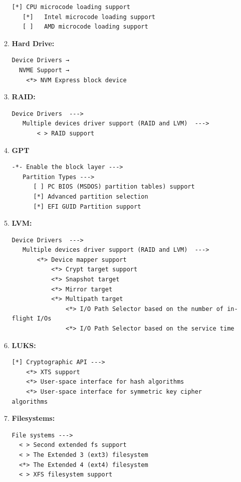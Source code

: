 \documentclass[10pt, a4paper, onecolumn, oneside, titlepage, openany]{book}
\begin{document}
\begin{enumerate}
\begin{enumerate}
\begin{Verbatim}[commandchars=\\\{\}]
   [*] CPU microcode loading support
   [*]   Intel microcode loading support
   [ ]   AMD microcode loading support
\end{Verbatim}
        \item \textbf{Hard Drive:}
\begin{Verbatim}[commandchars=\\\{\}]
Device Drivers →
  NVME Support →
    <*> NVM Express block device
\end{Verbatim}
        \item \textbf{RAID:}
\begin{Verbatim}[commandchars=\\\{\}]
Device Drivers  --->
   Multiple devices driver support (RAID and LVM)  --->
       < > RAID support
\end{Verbatim}
    \item \textbf{GPT}
\begin{Verbatim}[commandchars=\\\{\}]
-*- Enable the block layer --->
   Partition Types --->
      [ ] PC BIOS (MSDOS) partition tables) support
      [*] Advanced partition selection
      [*] EFI GUID Partition support
\end{Verbatim}
        \item \textbf{LVM:}
\begin{Verbatim}[commandchars=\\\{\}]
Device Drivers  --->
   Multiple devices driver support (RAID and LVM)  --->
       <*> Device mapper support
           <*> Crypt target support
           <*> Snapshot target
           <*> Mirror target
           <*> Multipath target
               <*> I/O Path Selector based on the number of in-flight I/Os
               <*> I/O Path Selector based on the service time
\end{Verbatim}
        \item \textbf{LUKS:}
\begin{Verbatim}[commandchars=\\\{\}]
[*] Cryptographic API --->
    <*> XTS support
    <*> User-space interface for hash algorithms
    <*> User-space interface for symmetric key cipher algorithms
\end{Verbatim}
        \item \textbf{Filesystems:}
\begin{Verbatim}[commandchars=\\\{\}]
File systems --->
  < > Second extended fs support
  < > The Extended 3 (ext3) filesystem
  <*> The Extended 4 (ext4) filesystem
  < > XFS filesystem support

\end{Verbatim}
\end{enumerate}
\end{enumerate}
\end{document}
